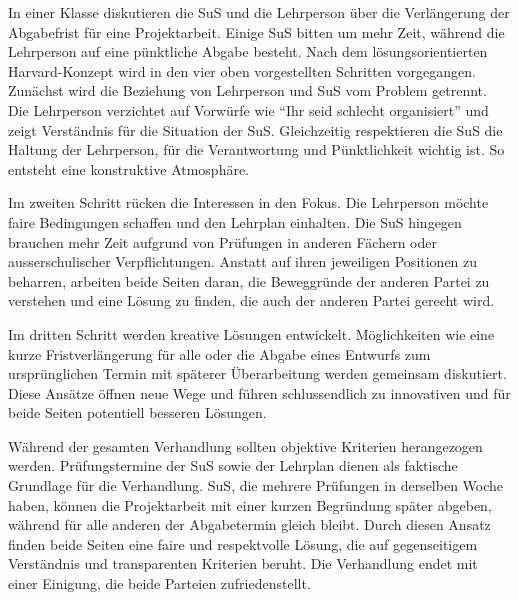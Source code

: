 \begin{myExBox}[title=Anwendung 2: Verhandlung mit Schülern]
In einer Klasse diskutieren die SuS und die Lehrperson über die Verlängerung der Abgabefrist für eine Projektarbeit. Einige SuS bitten um mehr Zeit, während die Lehrperson auf eine pünktliche Abgabe besteht. Nach dem lösungsorientierten Harvard-Konzept wird in den vier oben vorgestellten Schritten vorgegangen.
Zunächst wird die Beziehung von Lehrperson und SuS vom Problem getrennt. Die Lehrperson verzichtet auf Vorwürfe wie ``Ihr seid schlecht organisiert'' und zeigt Verständnis für die Situation der SuS. Gleichzeitig respektieren die SuS die Haltung der Lehrperson, für die Verantwortung und Pünktlichkeit wichtig ist. So entsteht eine konstruktive Atmosphäre.

Im zweiten Schritt rücken die Interessen in den Fokus. Die Lehrperson möchte faire Bedingungen schaffen und den Lehrplan einhalten. Die SuS hingegen brauchen mehr Zeit aufgrund von Prüfungen in anderen Fächern oder ausserschulischer Verpflichtungen. Anstatt auf ihren jeweiligen Positionen zu beharren, arbeiten beide Seiten daran, die Beweggründe der anderen Partei zu verstehen und eine Lösung zu finden, die auch der anderen Partei gerecht wird.

Im dritten Schritt werden kreative Lösungen entwickelt. Möglichkeiten wie eine kurze Fristverlängerung für alle oder die Abgabe eines Entwurfs zum ursprünglichen Termin mit späterer Überarbeitung werden gemeinsam diskutiert. Diese Ansätze öffnen neue Wege und führen schlussendlich zu innovativen und für beide Seiten potentiell besseren Lösungen.

Während der gesamten Verhandlung sollten objektive Kriterien herangezogen werden. Prüfungstermine der SuS sowie der Lehrplan dienen als faktische Grundlage für die Verhandlung. SuS, die mehrere Prüfungen in derselben Woche haben, können die Projektarbeit mit einer kurzen Begründung später abgeben, während für alle anderen der Abgabetermin gleich bleibt. Durch diesen Ansatz finden beide Seiten eine faire und respektvolle Lösung, die auf gegenseitigem Verständnis und transparenten Kriterien beruht. Die Verhandlung endet mit einer Einigung, die beide Parteien zufriedenstellt.

\end{myExBox}




